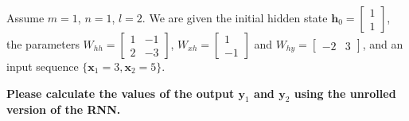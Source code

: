 \documentclass{article}
\newcommand{\x}{\mathbf{x}}
\newcommand{\h}{\mathbf{h}}
\newcommand{\y}{\mathbf{y}}
\begin{document}
\begin{probset}
\begin{prob}
    Assume $m = 1$, $n = 1$, $l = 2$. We are given the initial hidden state $\h_0 = \begin{bmatrix} 1 \\ 1 \end{bmatrix}$, the parameters $W_{hh} = \begin{bmatrix} 1 & -1 \\ 2 & -3 \end{bmatrix}$, $W_{xh} = \begin{bmatrix} 1 \\ -1 \end{bmatrix}$ and $W_{hy} = \begin{bmatrix} -2 & 3 \end{bmatrix}$, and an input sequence $\{ \x_1 = 3, \x_2 = 5 \}$.

    \textbf{Please calculate the values of the output $\y_1$ and $\y_2$ using the unrolled version of the RNN.}


\end{prob}
\end{probset}
\end{document}

